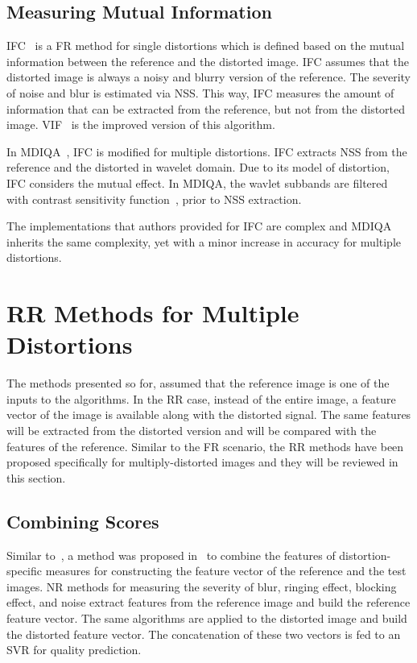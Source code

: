 \subsection{Measuring Mutual Information}
IFC~\cite{Sheikh2005} is a FR method for single distortions which is defined based on the mutual information between the reference and the distorted image. IFC assumes that the distorted image is always a noisy and blurry version of the reference. The severity of noise and blur is estimated via NSS. This way, IFC measures the amount of information that can be extracted from the reference, but not from the distorted image. VIF~\cite{Sheikh2006} is the improved version of this algorithm.

In MDIQA~\cite{zhang2019full}, IFC is modified for multiple distortions. IFC extracts NSS from the reference and the distorted in wavelet domain. Due to its model of distortion, IFC considers the mutual effect. In MDIQA, the wavlet subbands are filtered with contrast sensitivity function~\cite{ngan1986cosine}, prior to NSS extraction.

The implementations that authors provided for IFC are complex and MDIQA inherits the same complexity, yet with a minor increase in accuracy for multiple distortions.
\section{RR Methods for Multiple Distortions}
The methods presented so for, assumed that the reference image is one of the inputs to the algorithms. In the RR case, instead of the entire image, a feature vector of the image is available along with the distorted signal. The same features will be extracted from the distorted version and will be compared with the features of the reference. Similar to the FR scenario, the RR methods have been proposed specifically for multiply-distorted images and they will be reviewed in this section.
\subsection{Combining Scores}
Similar to~\cite{Chetouani2016}, a method was proposed in~\cite{Chetouani2015} to combine the features of distortion-specific measures for constructing the feature vector of the reference and the test images. NR methods for measuring the severity of blur, ringing effect, blocking effect, and noise extract features from the reference image and build the reference feature vector. The same algorithms are applied to the distorted image and build the distorted feature vector. The concatenation of these two vectors is fed to an SVR for quality prediction.

